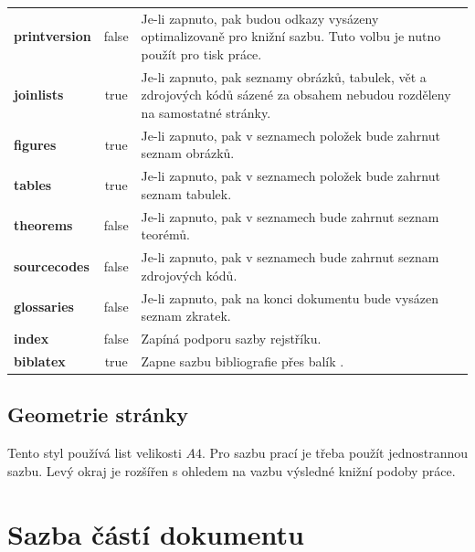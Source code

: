 \documentclass[
  field=inf,
  biblatex,
  glossaries,
  index
]{kidiplom}
\begin{document}
\begin{table}
\begin{center}
{\begin{tabular}{>{\bfseries}l >{\ttfamily}c L{8cm}}
printversion & false & Je-li zapnuto, pak budou odkazy vysázeny optimalizovaně pro knižní sazbu. Tuto volbu je nutno použít pro tisk práce. \\


joinlists & true & Je-li zapnuto, pak seznamy obrázků, tabulek, vět a
zdrojových kódů sázené za obsahem nebudou rozděleny na samostatné stránky. \\

figures & true & Je-li zapnuto, pak v seznamech položek bude zahrnut seznam obrázků. \\

tables & true & Je-li zapnuto, pak v seznamech položek bude zahrnut seznam tabulek. \\

theorems & false & Je-li zapnuto, pak v seznamech bude zahrnut seznam teorémů. \\

sourcecodes & false & Je-li zapnuto, pak v seznamech bude zahrnut seznam zdrojových kódů. \\

glossaries & false & Je-li zapnuto, pak na konci dokumentu bude vysázen seznam zkratek. \\

index & false & Zapíná podporu sazby rejstříku. \\

biblatex & true & Zapne sazbu bibliografie přes balík \BibLaTeX{}.
\end{tabular}}
\end{center}
\end{table}

\subsection{Geometrie stránky}
Tento styl používá list velikosti $A4$. Pro sazbu prací je třeba použít jednostrannou sazbu. Levý okraj je rozšířen s ohledem na vazbu výsledné knižní podoby práce.

\section{Sazba částí dokumentu}
\end{document}
